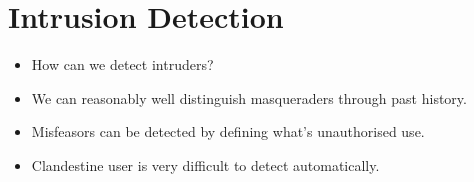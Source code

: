 %


\section{Intrusion Detection}

\begin{frame}
  \begin{question}
    \begin{itemize}
      \item How can we detect intruders?
    \end{itemize}
  \end{question}
\end{frame}

\begin{frame}
  \begin{idea}
    \begin{itemize}
      \item We can reasonably well distinguish masqueraders through past 
        history.

      \item Misfeasors can be detected by defining what's unauthorised use.

      \item Clandestine user is very difficult to detect automatically.
    \end{itemize}
  \end{idea}
\end{frame}

